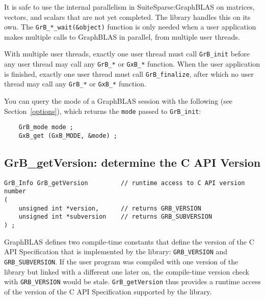 \documentclass[12pt]{article}
\begin{document}
It is safe to use the internal parallelism in SuiteSparse:GraphBLAS on
matrices, vectors, and scalars that are not yet completed.  The library
handles this on its own.  The \verb'GrB_*_wait(&object)' function is only
needed when a user application makes multiple calls to GraphBLAS in parallel,
from multiple user threads.

With multiple user threads, exactly one user thread must call \verb'GrB_init'
before any user thread may call any \verb'GrB_*' or \verb'GxB_*' function.
When the user application is finished, exactly one user thread must call
\verb'GrB_finalize', after which no user thread may call any \verb'GrB_*' or
\verb'GxB_*' function.

You can query the mode of a GraphBLAS session with the following
(see Section~\ref{options}), which returns the \verb'mode' passed to
\verb'GrB_init':

{\footnotesize
\begin{verbatim}
    GrB_mode mode ;
    GxB_get (GxB_MODE, &mode) ; \end{verbatim} }

\newpage
\subsection{{\sf GrB\_getVersion:} determine the C API Version} %
\label{getVersion}

\begin{mdframed}[userdefinedwidth=6in]
{\footnotesize
\begin{verbatim}
GrB_Info GrB_getVersion         // runtime access to C API version number
(
    unsigned int *version,      // returns GRB_VERSION
    unsigned int *subversion    // returns GRB_SUBVERSION
) ;
\end{verbatim}
}\end{mdframed}

GraphBLAS defines two compile-time constants that
define the version of the C API Specification
that is implemented by the library:
\verb'GRB_VERSION' and \verb'GRB_SUBVERSION'.
If the user program was compiled with one
version of the library but linked with a different one later on, the
compile-time version check with \verb'GRB_VERSION' would be stale.
\verb'GrB_getVersion' thus provides a runtime access of the version of the C
API Specification supported by the library.
\end{document}

